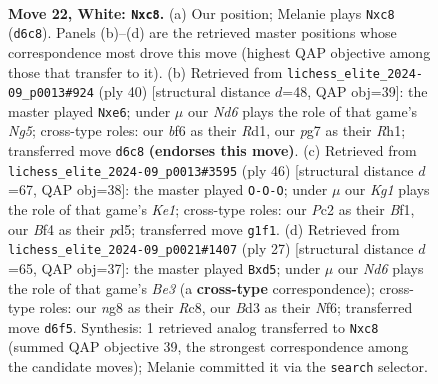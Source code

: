 \documentclass[11pt]{article}
\begin{document}
\clearpage

\begin{figure}[p]\centering
\begin{subfigure}{0.46\textwidth}\centering
\resizebox{\linewidth}{!}{%
\newchessgame
\chessboard[
  setfen={r1b2knr/p5pp/2pN1b2/5p2/5B2/3B1P1P/PPP3P1/R2R2K1 w - - 5 22},
  showmover=false,
  pgfstyle=straightmove, color=movearrow, markmove={d6-c8}
]}
\caption{}
\end{subfigure}\hfill
\begin{subfigure}{0.46\textwidth}\centering
\resizebox{\linewidth}{!}{%
\newchessgame
\chessboard[
  setfen={1k1r1b1r/ppp4p/3nb1p1/4p1N1/8/4B3/PPP2PPP/1K1R3R w - - 0 21},
  showmover=false,
  pgfstyle=straightmove, color=movearrow, markmove={g5-e6}
]}
\caption{}
\end{subfigure}
\\[4pt]
\begin{subfigure}{0.46\textwidth}\centering
\resizebox{\linewidth}{!}{%
\newchessgame
\chessboard[
  setfen={rn4r1/pp3kPp/b4p1B/3pp3/6P1/2P2P2/P3P3/R3KB1R w KQ - 2 24},
  showmover=false,
  pgfstyle=straightmove, color=movearrow, markmove={e1-c1}
]}
\caption{}
\end{subfigure}\hfill
\begin{subfigure}{0.46\textwidth}\centering
\resizebox{\linewidth}{!}{%
\newchessgame
\chessboard[
  setfen={2r4r/p2k1ppp/4bn2/2bNp3/8/6P1/PP2PPBP/R1BR2K1 b - - 0 14},
  showmover=false,
  pgfstyle=straightmove, color=movearrow, markmove={e6-d5}
]}
\caption{}
\end{subfigure}
\caption{\textbf{Move 22, White: \texttt{Nxc8}.} (a) Our position; Melanie plays \texttt{Nxc8} (\texttt{d6c8}). Panels (b)--(d) are the retrieved master positions whose correspondence most drove this move (highest QAP objective among those that transfer to it). (b) Retrieved from \texttt{lichess\_elite\_2024-09\_p0013\#924} (ply 40) [structural distance $d$=48, QAP obj=39]: the master played \texttt{Nxe6}; under $\mu$ our \emph{Nd6} plays the role of that game's \emph{Ng5}; cross-type roles: our \emph{b}f6 as their \emph{R}d1, our \emph{p}g7 as their \emph{R}h1; transferred move \texttt{d6c8} \textbf{(endorses this move)}. (c) Retrieved from \texttt{lichess\_elite\_2024-09\_p0013\#3595} (ply 46) [structural distance $d$=67, QAP obj=38]: the master played \texttt{O-O-O}; under $\mu$ our \emph{Kg1} plays the role of that game's \emph{Ke1}; cross-type roles: our \emph{P}c2 as their \emph{B}f1, our \emph{B}f4 as their \emph{p}d5; transferred move \texttt{g1f1}. (d) Retrieved from \texttt{lichess\_elite\_2024-09\_p0021\#1407} (ply 27) [structural distance $d$=65, QAP obj=37]: the master played \texttt{Bxd5}; under $\mu$ our \emph{Nd6} plays the role of that game's \emph{Be3} (a \textbf{cross-type} correspondence); cross-type roles: our \emph{n}g8 as their \emph{R}c8, our \emph{B}d3 as their \emph{N}f6; transferred move \texttt{d6f5}. Synthesis: 1 retrieved analog transferred to \texttt{Nxc8} (summed QAP objective 39, the strongest correspondence among the candidate moves); Melanie committed it via the \texttt{search} selector.}
\label{fig:thought-m42}
\end{figure}
\end{document}
